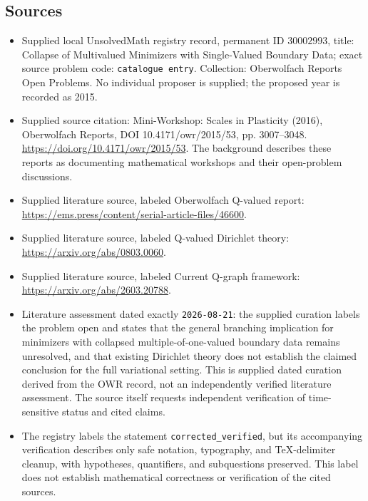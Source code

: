 \documentclass[11pt]{article}
\begin{document}
\subsection{Sources}
\begin{itemize}
\item Supplied local UnsolvedMath registry record, permanent ID \(30002993\), title: Collapse of Multivalued Minimizers with Single-Valued Boundary Data; exact source problem code: \texttt{catalogue entry}. Collection: Oberwolfach Reports Open Problems. No individual proposer is supplied; the proposed year is recorded as 2015.
\item Supplied source citation: Mini-Workshop: Scales in Plasticity (2016), Oberwolfach Reports, DOI 10.4171/owr/2015/53, pp. 3007--3048. \url{https://doi.org/10.4171/owr/2015/53}. The background describes these reports as documenting mathematical workshops and their open-problem discussions.
\item Supplied literature source, labeled Oberwolfach Q-valued report: \url{https://ems.press/content/serial-article-files/46600}.
\item Supplied literature source, labeled Q-valued Dirichlet theory: \url{https://arxiv.org/abs/0803.0060}.
\item Supplied literature source, labeled Current Q-graph framework: \url{https://arxiv.org/abs/2603.20788}.
\item Literature assessment dated exactly \texttt{2026-08-21}: the supplied curation labels the problem open and states that the general branching implication for minimizers with collapsed multiple-of-one-valued boundary data remains unresolved, and that existing Dirichlet theory does not establish the claimed conclusion for the full variational setting. This is supplied dated curation derived from the OWR record, not an independently verified literature assessment. The source itself requests independent verification of time-sensitive status and cited claims.
\item The registry labels the statement \texttt{corrected\_verified}, but its accompanying verification describes only safe notation, typography, and TeX-delimiter cleanup, with hypotheses, quantifiers, and subquestions preserved. This label does not establish mathematical correctness or verification of the cited sources.
\end{itemize}
\end{document}
